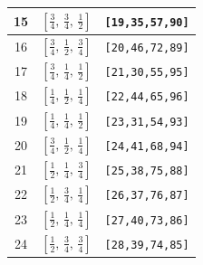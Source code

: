 \documentclass[fleqn,8pt]{jsarticle}
\begin{document}
\begin{longtable}{ccc}
15 & $\left[ \frac{3}{4},\, \frac{3}{4},\, \frac{1}{2} \right]$ & {\tt [19,35,57,90]} \\ \hline
16 & $\left[ \frac{3}{4},\, \frac{1}{2},\, \frac{3}{4} \right]$ & {\tt [20,46,72,89]} \\ \hline
17 & $\left[ \frac{3}{4},\, \frac{1}{4},\, \frac{1}{2} \right]$ & {\tt [21,30,55,95]} \\ \hline
18 & $\left[ \frac{1}{4},\, \frac{1}{2},\, \frac{1}{4} \right]$ & {\tt [22,44,65,96]} \\ \hline
19 & $\left[ \frac{1}{4},\, \frac{1}{4},\, \frac{1}{2} \right]$ & {\tt [23,31,54,93]} \\ \hline
20 & $\left[ \frac{3}{4},\, \frac{1}{2},\, \frac{1}{4} \right]$ & {\tt [24,41,68,94]} \\ \hline
21 & $\left[ \frac{1}{2},\, \frac{1}{4},\, \frac{3}{4} \right]$ & {\tt [25,38,75,88]} \\ \hline
22 & $\left[ \frac{1}{2},\, \frac{3}{4},\, \frac{1}{4} \right]$ & {\tt [26,37,76,87]} \\ \hline
23 & $\left[ \frac{1}{2},\, \frac{1}{4},\, \frac{1}{4} \right]$ & {\tt [27,40,73,86]} \\ \hline
24 & $\left[ \frac{1}{2},\, \frac{3}{4},\, \frac{3}{4} \right]$ & {\tt [28,39,74,85]} \\
\end{longtable}
\renewcommand{\arraystretch}{1.2}
\end{document}
